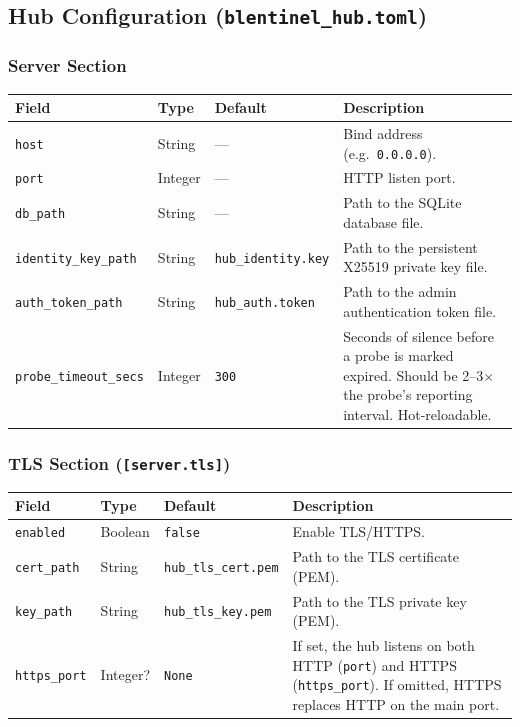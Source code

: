 \documentclass[12pt]{report}
\begin{document}
\subsection{Hub Configuration (\texttt{blentinel\_hub.toml})}

\subsubsection{Server Section}

\begin{longtable}{@{} l l l p{5.5cm} @{}}
\toprule
\textbf{Field} & \textbf{Type} & \textbf{Default} & \textbf{Description} \\
\midrule
\texttt{host} & String & --- & Bind address (e.g.\ \texttt{0.0.0.0}). \\
\texttt{port} & Integer & --- & HTTP listen port. \\
\texttt{db\_path} & String & --- & Path to the SQLite database file. \\
\texttt{identity\_key\_path} & String & \texttt{hub\_identity.key} &
    Path to the persistent X25519 private key file. \\
\texttt{auth\_token\_path} & String & \texttt{hub\_auth.token} &
    Path to the admin authentication token file. \\
\texttt{probe\_timeout\_secs} & Integer & \texttt{300} &
    Seconds of silence before a probe is marked expired. Should be 2--3$\times$
    the probe's reporting interval. Hot-reloadable. \\
\bottomrule
\end{longtable}

\subsubsection{TLS Section (\texttt{[server.tls]})}

\begin{longtable}{@{} l l l p{5.5cm} @{}}
\toprule
\textbf{Field} & \textbf{Type} & \textbf{Default} & \textbf{Description} \\
\midrule
\texttt{enabled} & Boolean & \texttt{false} & Enable TLS/HTTPS. \\
\texttt{cert\_path} & String & \texttt{hub\_tls\_cert.pem} &
    Path to the TLS certificate (PEM). \\
\texttt{key\_path} & String & \texttt{hub\_tls\_key.pem} &
    Path to the TLS private key (PEM). \\
\texttt{https\_port} & Integer? & \texttt{None} &
    If set, the hub listens on both HTTP (\texttt{port}) and HTTPS
    (\texttt{https\_port}). If omitted, HTTPS replaces HTTP on the main port.
    \\
\bottomrule
\end{longtable}
\end{document}
